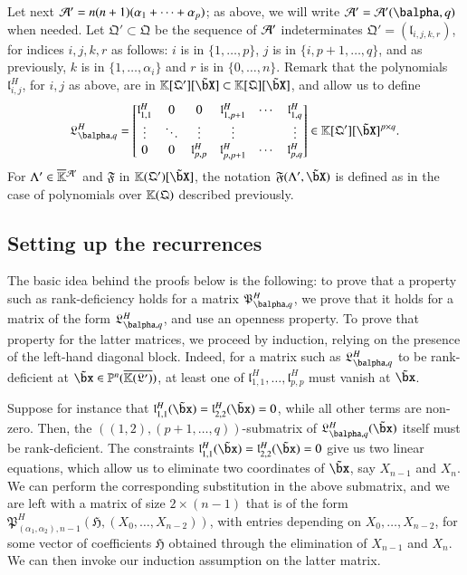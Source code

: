 \documentclass[amsthm]{elsart}
\begin{document}
Let next ${\cal A}'=n(n+1)(\alpha_1+\cdots+\alpha_p)$; as above, 
we will write ${\cal A}'={\cal A}'(\balpha,q)$ when needed. Let
$\mathfrak{Q}'\subset \mathfrak{Q}$ be the sequence of ${\cal A}'$
indeterminates $\mathfrak{Q}'=(\mathfrak{l}_{i,j,k,r})$, for indices
$i,j,k,r$ as follows: $i$ is in $\{1,\dots,p\}$, $j$ is in
$\{i,p+1,\dots,q\}$, and as previously, $k$ is in
$\{1,\dots,\alpha_i\}$ and $r$ is in $\{0,\dots,n\}$. Remark that the
polynomials $\mathfrak{l}^H_{i,j}$, for $i,j$ as above, are in
$\KK[\mathfrak{Q}'][\tilde\bX] \subset \KK[\mathfrak{Q}][\tilde \bX]$,
and allow us to define
\begin{align}\label{eq:matMprime}
\mathfrak{L}^H_{\balpha,q}=\left [\begin{matrix} \mathfrak{l}^H_{1,1} & 0 & 0
    &\mathfrak{l}^H_{1,p+1} & \cdots & \mathfrak{l}^H_{1,q}\\ \vdots & \ddots &
    \vdots & \vdots & & \vdots\\ 0&0& \mathfrak{l}^H_{p,p}
    &\mathfrak{l}^H_{p,p+1} & \cdots & \mathfrak{l}^H_{p,q}
  \end{matrix}\right ]\in \KK[\mathfrak{Q}'][\tilde\bX]^{p\times q}.
\end{align}
For $\Lambda' \in \KKbar{}^{{\cal A}'}$ and $\mathfrak{F}$ in 
$\KK(\mathfrak{Q}')[\tilde\bX]$, the notation
$\mathfrak{F}(\Lambda',\tilde\bX)$ is defined as in the case of
polynomials over $\mathbb{K}(\mathfrak{Q})$ described previously.


\subsection{Setting up the recurrences}
The basic idea behind the proofs below is the following: to prove that
a property such as rank-deficiency holds for a matrix
$\mathfrak{P}^H_{\balpha,q}$, we prove that it holds for a matrix of
the form $\mathfrak{L}^H_{\balpha,q}$, and use an openness
property. To prove that property for the latter matrices, we proceed
by induction, relying on the presence of the left-hand diagonal
block. Indeed, for a matrix such as $\mathfrak{L}^H_{\balpha,q}$ to be
rank-deficient at $\tilde\bx \in \P^n(\KKGpbar)$, at least one of
$\mathfrak{l}^H_{1,1},\dots,\mathfrak{l}^H_{p,p}$ must vanish at
$\tilde\bx$.

Suppose for instance that
$\mathfrak{l}^H_{1,1}(\tilde\bx)=\mathfrak{l}^H_{2,2}(\tilde\bx)=0$,
while all other terms are non-zero. Then, the
$((1,2),(p+1,\dots,q))$-submatrix of
${\mathfrak{L}^H_{\balpha,q}}(\tilde\bx)$ itself must be
rank-deficient.  The constraints
$\mathfrak{l}^H_{1,1}(\tilde\bx)=\mathfrak{l}^H_{2,2}(\tilde\bx)=0$
give us two linear equations, which allow us to eliminate two
coordinates of $\tilde\bx$, say $X_{n-1}$ and $X_n$. We can perform
the corresponding substitution in the above submatrix, and we are left
with a matrix of size $2 \times (n-1)$ that is of the form
$\mathfrak{P}^H_{(\alpha_1,\alpha_2),n-1}(\mathfrak{H},(X_0,\dots,X_{n-2}))$,
with entries depending on $X_0,\dots,X_{n-2}$, for some vector of
coefficients $\mathfrak{H}$ obtained through the elimination of
$X_{n-1}$ and $X_n$. We can then invoke our induction assumption on
the latter matrix.
\end{document}
